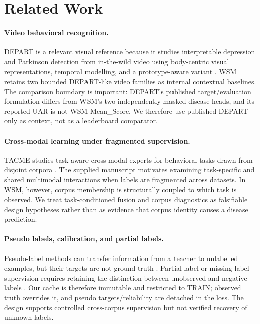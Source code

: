 \section{Related Work}
\label{sec:related}

\paragraph{Video behavioral recognition.}
DEPART is a relevant visual reference because it studies interpretable depression and Parkinson detection from in-the-wild video using body-centric visual representations, temporal modelling, and a prototype-aware variant \citep{ryumina2026depart}. WSM retains two bounded DEPART-like video families as internal contextual baselines. The comparison boundary is important: DEPART's published target/evaluation formulation differs from WSM's two independently masked disease heads, and its reported UAR is not WSM Mean\_Score. We therefore use published DEPART only as context, not as a leaderboard comparator.

\paragraph{Cross-modal learning under fragmented supervision.}
TACME studies task-aware cross-modal experts for behavioral tasks drawn from disjoint corpora \citep{ryuminatacme}. The supplied manuscript motivates examining task-specific and shared multimodal interactions when labels are fragmented across datasets. In WSM, however, corpus membership is structurally coupled to which task is observed. We treat task-conditioned fusion and corpus diagnostics as falsifiable design hypotheses rather than as evidence that corpus identity causes a disease prediction.

\paragraph{Pseudo labels, calibration, and partial labels.}
Pseudo-label methods can transfer information from a teacher to unlabelled examples, but their targets are not ground truth \citep{lee2013pseudo}. Partial-label or missing-label supervision requires retaining the distinction between unobserved and negative labels \citep{durand2019learning}. Our cache is therefore immutable and restricted to TRAIN; observed truth overrides it, and pseudo targets/reliability are detached in the loss. The design supports controlled cross-corpus supervision but not verified recovery of unknown labels.

